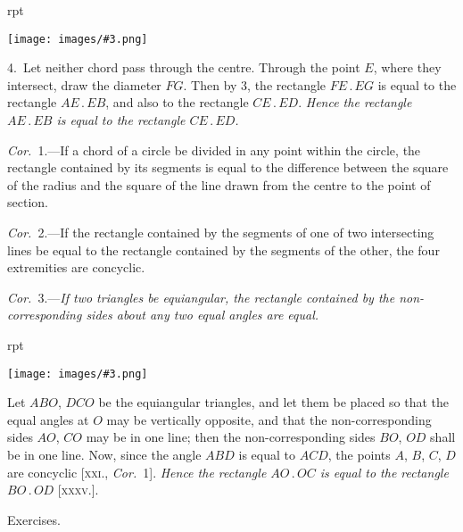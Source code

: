 \documentclass[oneside]{book}
\newcounter{wrapwidth}
\newcommand\exhead[1]{
\Needspace*{5\baselineskip}\begin{center}
\textsf{#1}
\end{center}
}
\newcommand\imgflow[3]{
\setcounter{wrapwidth}{#1}
\begin{wrapfigure}[#2]{r}{\value{wrapwidth}pt}
\begin{center}
\vspace{-0.3in}
\texttt{[image: images/\#3.png]}
\end{center}
\end{wrapfigure}
}
\begin{document}

\imgflow{112}{10}{f145}

4.~Let neither chord pass through the centre.
Through the\label{thopoint} point $E$, where they
intersect, draw the diameter $FG$.
Then by 3, the rectangle $FE\,.\,EG$
is equal to the rectangle $AE\,.\,EB$,
and also to the rectangle $CE\,.\,ED$.
\emph{Hence the rectangle $AE\,.\,EB$ is
equal to the rectangle $CE\,.\,ED$.}

\emph{Cor.}~1.---If a chord of a circle
be divided in any point within
the circle, the rectangle contained by its segments is
equal to the difference between the square of the
radius and the square of the line drawn from the
centre to the point of section.

\emph{Cor.}~2.---If the rectangle contained by the segments
of one of two intersecting lines be equal to the rectangle
contained by the segments of the other, the four
extremities are concyclic.

\textit{Cor.}~3.---\textit{If two triangles be equiangular, the rectangle
contained by the non-corresponding
sides about any two equal angles are
equal.}

\imgflow{100}{9}{f146}
Let $ABO$, $DCO$ be the equiangular
triangles, and let them be
placed so that the equal angles at
$O$ may be vertically opposite, and
that the non-corresponding sides
$AO$, $CO$ may be in one line; then
the non-corresponding sides $BO$, $OD$ shall be in one
line. Now, since the angle $ABD$ is equal to $ACD$, the
points $A$, $B$, $C$, $D$ are concyclic\label{concylic2} [\textsc{xxi.}, \emph{Cor.}~1]. \emph{Hence
the rectangle $AO\,.\,OC$ is equal to the rectangle $BO\,.\,OD$}
[\textsc{xxxv}.].

\exhead{Exercises.}
\end{document}
